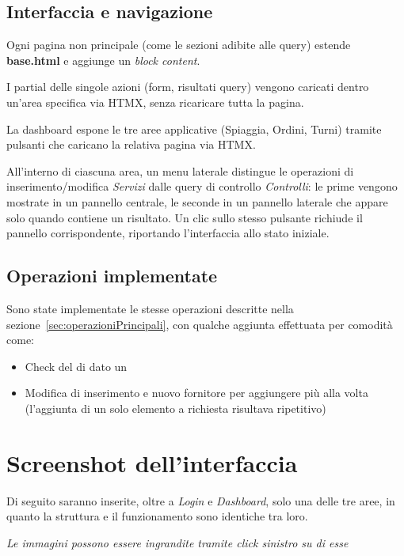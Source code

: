 \subsection{Interfaccia e navigazione}

Ogni pagina non principale (come le sezioni adibite alle query) estende \textbf{base.html} e 
aggiunge un \textit{block content}.

I partial delle singole azioni (form, risultati query) vengono caricati 
dentro un'area specifica via HTMX, senza ricaricare tutta la pagina.

La dashboard espone le tre aree applicative (Spiaggia, Ordini, Turni) tramite
pulsanti che caricano la relativa pagina via HTMX.

All'interno di ciascuna area, un menu laterale distingue le operazioni di inserimento/modifica
\textit{Servizi} dalle query di controllo \textit{Controlli}: le prime vengono
mostrate in un pannello centrale, le seconde in un pannello laterale che
appare solo quando contiene un risultato. Un clic sullo stesso pulsante
richiude il pannello corrispondente, riportando l'interfaccia allo stato
iniziale.

\subsection{Operazioni implementate}
Sono state implementate le stesse operazioni descritte nella sezione~\ref{sec:operazioniPrincipali}, 
con qualche aggiunta effettuata per comodità come:
\begin{itemize}
  \item Check del  di dato un 
  \item Modifica di inserimento  e nuovo fornitore per aggiungere più  alla volta 
  (l'aggiunta di un solo elemento a richiesta risultava ripetitivo)
\end{itemize} 

\clearpage

\section{Screenshot dell'interfaccia}

Di seguito saranno inserite, oltre a \textit{Login} e \textit{Dashboard}, solo una delle tre aree, in
quanto la struttura e il funzionamento sono identiche tra loro.
\begin{center}
  \textit{Le immagini possono essere ingrandite tramite click sinistro su di esse}
\end{center}

